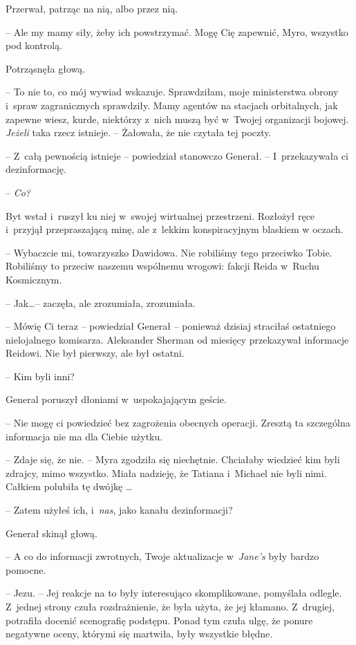 \documentclass[oneside,polish,11pt,sfheadings]{mwbk}
\begin{document}
Przerwał, patrząc na nią, albo przez nią. 

-- Ale my mamy siły, żeby ich
powstrzymać. Mogę Cię zapewnić, Myro, wszystko pod kontrolą.

Potrząsnęła głową. 

-- To nie to, co mój wywiad wskazuje. Sprawdziłam,
moje ministerstwa obrony i~spraw zagranicznych sprawdziły. Mamy agentów
na stacjach orbitalnych, jak zapewne wiesz, kurde, niektórzy z~nich
muszą być w~Twojej organizacji bojowej. \textit{Jeżeli} taka rzecz
istnieje. -- Żałowała, że nie czytała tej poczty.

-- Z~całą pewnością istnieje -- powiedział stanowczo Generał. -- I~przekazywała ci dezinformację.

-- \textit{Co?}

Byt wstał i~ruszył ku niej w~swojej wirtualnej przestrzeni. Rozłożył
ręce i~przyjął przepraszającą minę, ale z~lekkim konspiracyjnym blaskiem
w oczach.

-- Wybaczcie mi, towarzyszko Dawidowa. Nie robiliśmy tego przeciwko
Tobie. Robiliśmy to przeciw naszemu wspólnemu wrogowi: fakcji Reida w~Ruchu Kosmicznym.

-- Jak\ldots -- zaczęła, ale zrozumiała, zrozumiała.

-- Mówię Ci teraz -- powiedział Generał -- ponieważ dzisiaj straciłaś
ostatniego nielojalnego komisarza. Aleksander Sherman od miesięcy
przekazywał informacje Reidowi. Nie był pierwszy, ale był ostatni.

-- Kim byli inni?

General poruszył dłoniami w~uspokajającym geście. 

-- Nie mogę ci
powiedzieć bez zagrożenia obecnych operacji. Zresztą ta szczególna
informacja nie ma dla Ciebie użytku.

-- Zdaje się, że nie. -- Myra zgodziła się niechętnie. Chciałaby wiedzieć
kim byli zdrajcy, mimo wszystko. Miała nadzieję, że Tatiana i~Michael
nie byli nimi. Całkiem polubiła tę dwójkę \ldots

-- Zatem użyłeś ich, i~\textit{nas}, jako kanału dezinformacji?

Generał skinął głową. 

-- A co do informacji zwrotnych, Twoje
aktualizacje w~\textit{Jane's} były bardzo pomocne.

-- Jezu. -- Jej reakcje na to były interesująco skomplikowane, pomyślała
odlegle. Z~jednej strony czuła rozdrażnienie, że była użyta, że jej
kłamano. Z~drugiej, potrafiła docenić scenografię podstępu. Ponad tym
czuła ulgę, że ponure negatywne oceny, którymi się martwiła, były
wszystkie błędne.
\end{document}
